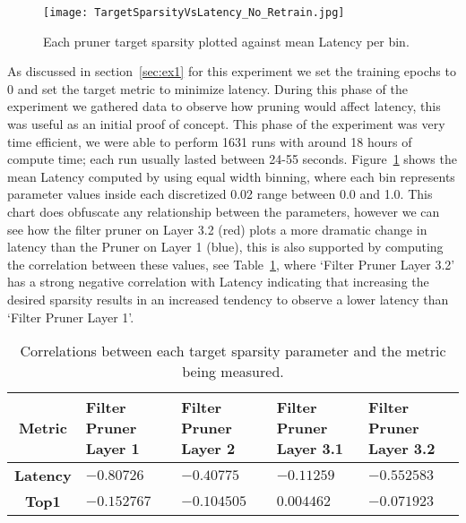 \documentclass[../Dissertation.tex]{subfiles}
\begin{document}
\begin{figure}[H]
    \texttt{[image: TargetSparsityVsLatency\_No\_Retrain.jpg]}
    \caption{Each pruner target sparsity plotted against mean Latency per bin.}
    \label{fig:fastPruneParamVSLatency}
\end{figure}

As discussed in section~\ref{sec:ex1} for this experiment we set the training epochs to 0 and set the target metric to minimize latency. 
During this phase of the experiment we gathered data to observe how pruning would affect latency, this was useful as an initial proof of concept.
This phase of the experiment was very time efficient, we were able to perform 1631 runs with around 18 hours of compute time; each run usually lasted between 24-55 seconds. 
Figure~\ref{fig:fastPruneParamVSLatency} shows the mean Latency computed by using equal width binning, where each bin represents parameter values inside each discretized 0.02 range between 0.0 and 1.0.
This chart does obfuscate any relationship between the parameters, however we can see how the filter pruner on Layer 3.2 (red) plots a more dramatic change in latency than the Pruner on Layer 1 (blue), this is also supported by computing the correlation between these values, see Table~\ref{tab:fastPruneCorrelations}, where `Filter Pruner Layer 3.2' has a strong negative correlation with Latency indicating that increasing the desired sparsity results in an increased tendency to observe a lower latency than `Filter Pruner Layer 1'.

\singlespacing
\begin{table}[H]
    \centering
    \begin{tabular}{@{}cp{26mm}p{26mm}p{26mm}p{26mm}@{}}
    \toprule
    \textbf{Metric}  & \textbf{Filter Pruner  Layer 1} & \textbf{Filter Pruner Layer 2} & \textbf{Filter Pruner Layer 3.1} & \textbf{Filter Pruner Layer 3.2} \\ \midrule
    \textbf{Latency} & $-0.80726$                        & $-0.40775$                      & $-0.11259$                         & $-0.552583$                         \\
    \textbf{Top1}    & $-0.152767$                       & $-0.104505$                     & $0.004462$                        & $-0.071923$                     \\ \bottomrule
    \end{tabular}
    \caption{Correlations between each target sparsity parameter and the metric being measured.}
    \label{tab:fastPruneCorrelations}
\end{table}
\doublespacing
\end{document}
